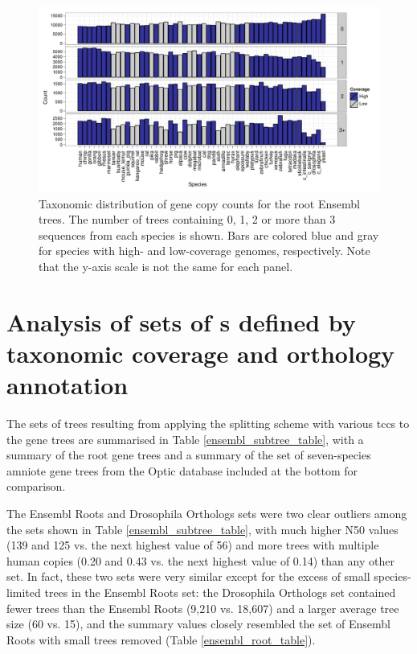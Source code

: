 \begin{landscape}
\begin{figure}
\centering
\includegraphics[scale=0.9]{Figs/ortholog_root_dups.pdf}
\caption{Taxonomic distribution of gene copy counts for the root
  Ensembl trees. The number of trees containing 0, 1, 2 or more than 3
  sequences from each species is shown. Bars are colored blue and gray
  for species with high- and low-coverage genomes, respectively. Note
  that the y-axis scale is not the same for each panel.}
\label{ortholog_root_dups}
\end{figure}
\end{landscape}

\section{Analysis of sets of \subtr{}s defined by taxonomic coverage and orthology annotation}
\label{section_analysis_sets_subtrees}

The sets of trees resulting from applying the \subtr splitting scheme
with various \acp{tcc} to the \cmp gene trees are summarised in Table
\ref{ensembl_subtree_table}, with a summary of the root \cmp gene
trees and a summary of the set of seven-species amniote gene trees
from the Optic database \citep{Heger2008} included at the bottom for
comparison.

The Ensembl Roots and Drosophila Orthologs sets were two clear
outliers among the \subtr sets shown in Table
\ref{ensembl_subtree_table}, with much higher N50 values (139 and 125
vs. the next highest value of 56) and more trees with multiple human
copies (0.20 and 0.43 vs. the next highest value of 0.14) than any
other \subtr set. In fact, these two \subtr sets were very similar
except for the excess of small species-limited trees in the Ensembl
Roots set: the Drosophila Orthologs set contained fewer trees than the
Ensembl Roots (9,210 vs. 18,607) and a larger average tree size (60
vs. 15), and the summary values closely resembled the set of Ensembl
Roots with small trees removed (Table \ref{ensembl_root_table}).

